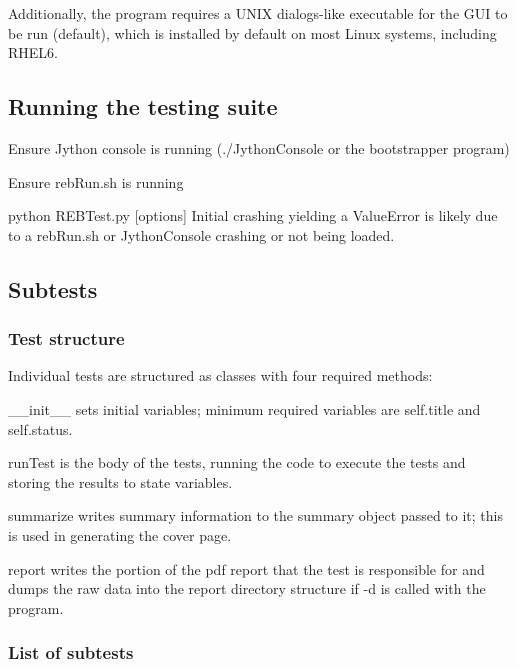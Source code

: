 Additionally, the program requires a U\+N\+IX dialogs-\/like executable for the G\+UI to be run (default), which is installed by default on most Linux systems, including R\+H\+E\+L6.

\subsection*{Running the testing suite}


\begin{DoxyItemize}
\item Ensure Jython console is running (./\+Jython\+Console or the bootstrapper program)
\item Ensure {\ttfamily reb\+Run.\+sh} is running
\item {\ttfamily python R\+E\+B\+Test.\+py \mbox{[}options\mbox{]}} Initial crashing yielding a Value\+Error is likely due to a {\ttfamily reb\+Run.\+sh} or {\ttfamily Jython\+Console} crashing or not being loaded.
\end{DoxyItemize}

\subsection*{Subtests}

\subsubsection*{Test structure}

Individual tests are structured as classes with four required methods\+:
\begin{DoxyItemize}
\item {\ttfamily \+\_\+\+\_\+init\+\_\+\+\_\+} sets initial variables; minimum required variables are {\ttfamily self.\+title} and {\ttfamily self.\+status}.
\item {\ttfamily run\+Test} is the body of the tests, running the code to execute the tests and storing the results to state variables.
\item {\ttfamily summarize} writes summary information to the summary object passed to it; this is used in generating the cover page.
\item {\ttfamily report} writes the portion of the pdf report that the test is responsible for and dumps the raw data into the report directory structure if {\ttfamily -\/d} is called with the program.
\end{DoxyItemize}

\subsubsection*{List of subtests}


